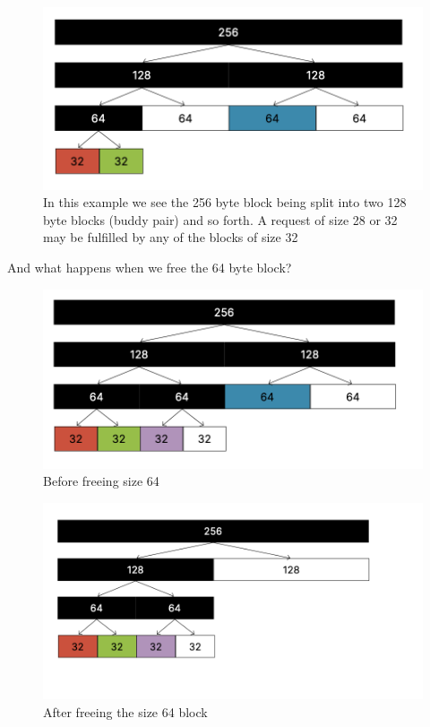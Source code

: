 \documentclass[../notes.tex]{subfiles}
\begin{document}
\begin{figure}[H]
    \centering
    \includegraphics[width=0.8\linewidth]{img/image_2023-04-03-15-25-49.png}
    \caption{In this example we see the 256 byte block being split into two 128 byte blocks (buddy pair) and so forth. A request of size 28 or 32 may be fulfilled by any of the blocks of size 32}
\end{figure}

And what happens when we free the 64 byte block?

\begin{figure}[H]
    \centering
    \includegraphics[width=0.8\linewidth]{img/image_2023-04-03-15-27-12.png}
    \caption{Before freeing size 64}
\end{figure}

\begin{figure}[H]
    \centering
    \includegraphics[width=0.8\linewidth]{img/image_2023-04-03-15-27-20.png}
    \caption{After freeing the size 64 block}
\end{figure}
\end{document}
